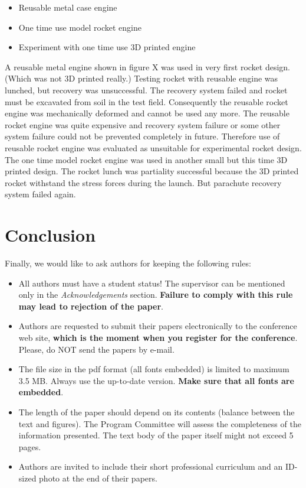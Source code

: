 \documentclass{poster16}
\begin{document}
\begin{itemize}
\item Reusable metal case engine
\item One time use model rocket engine
\item Experiment with one time use 3D printed engine
\end{itemize}

A reusable metal engine shown in figure X was used in very first rocket design. (Which was not 3D printed really.) Testing rocket with reusable engine was lunched, but recovery was unsuccessful. The recovery system failed and rocket must be excavated from soil in the test field. Consequently the reusable rocket engine was mechanically deformed and cannot be used any more.
The reusable rocket engine was quite expensive and recovery system failure or some other system failure could not be prevented completely in future. Therefore use of reusable rocket engine was evaluated as unsuitable for experimental rocket design. 
The one time model rocket engine was used in another small but this time 3D printed design. The rocket lunch was partiality successful because the 3D printed rocket withstand the stress forces during the launch.  But parachute recovery system failed again. 


\section{Conclusion}
Finally, we would like to ask authors for keeping the following rules:
\begin{itemize}
\item All authors must have a student status! The supervisor can be mentioned only in the \emph{Acknowledgements} section. \textbf{Failure to comply with this rule may lead to rejection of the paper}.

\item Authors are requested to submit their papers electronically to the conference web site, \textbf{which is the moment when you register for the conference}. Please, do NOT send the papers by e-mail. 

\item The file size in the pdf format (all fonts embedded) is limited to maximum 3.5 MB. Always use the up-to-date version. \textbf{Make sure that all fonts are embedded}. 

\item The length of the paper should depend on its contents (balance between the text and figures). The Program Committee will assess the completeness of the information presented. The text body of the paper itself might not exceed 5 pages. 

\item Authors are invited to include their short professional curriculum and an ID-sized photo at the end of their papers.
\end{itemize}
\end{document}
